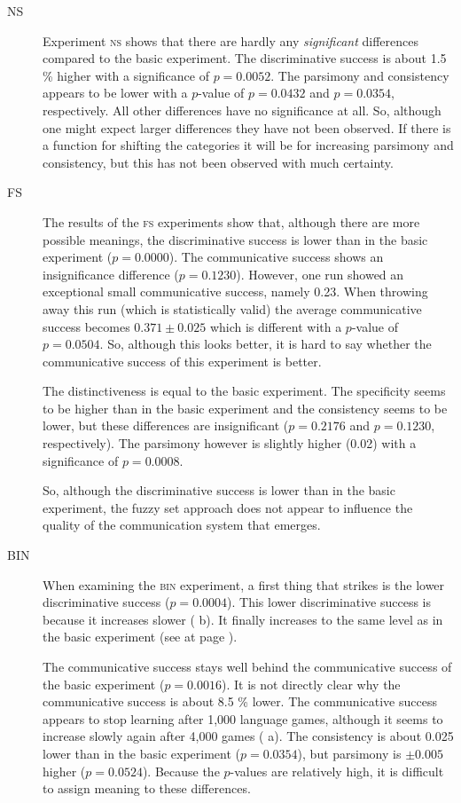\begin{description}
\item[NS] Experiment {\scshape ns} shows that there are hardly any {\em significant} differences compared to the basic experiment. The discriminative success is about 1.5 \% higher with a significance of $p=0.0052$. The parsimony and consistency appears to be lower with a $p$-value of $p=0.0432$ and $p=0.0354$, respectively. All other differences have no significance at all. So, although one might expect larger differences they have not been observed. If there is a function for shifting the categories it will be for increasing parsimony and consistency, but this has not been observed with much certainty.

\item[FS] The results of the {\scshape fs} experiments show that, although there are more possible meanings, the discriminative success is lower than in the basic experiment ($p=0.0000$). The communicative success shows an insignificance difference ($p=0.1230$). However, one run showed an exceptional small communicative success, namely 0.23. When throwing away this run (which is statistically valid) the average communicative success becomes $0.371 \pm 0.025$ which is different with a $p$-value of $p=0.0504$. So, although this looks better, it is hard to say whether the communicative success of this experiment is better. 

The distinctiveness is equal to the basic experiment. The specificity seems to be higher than in the basic experiment and the consistency seems to be lower, but these differences are insignificant ($p=0.2176$ and $p=0.1230$, respectively). The parsimony however is slightly higher (0.02) with a significance of $p=0.0008$.

So, although the discriminative success is lower than in the basic experiment, the fuzzy set approach does not appear to influence the quality of the communication system that emerges. 

\item[BIN] When examining the {\scshape bin} experiment, a first thing that strikes is the lower discriminative success ($p=0.0004$). This lower discriminative success is because it increases slower ( b). It finally increases to the same level as in the basic experiment (see  at page \pageref{f:st:plot}).

The communicative success stays well behind the communicative success of the basic experiment ($p=0.0016$). It is not directly clear why the communicative success is about 8.5 \% lower. The communicative success appears to stop learning after 1,000 language games, although it seems to increase slowly again after 4,000 games ( a). The consistency is about 0.025 lower than in the basic experiment ($p=0.0354$), but parsimony is $\pm 0.005$ higher ($p=0.0524$). Because the $p$-values are relatively high, it is difficult to assign meaning to these differences.


\end{description}
